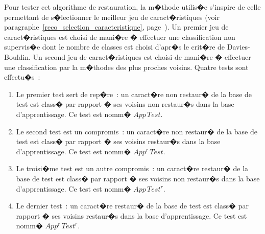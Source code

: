         
        
        
Pour tester cet algorithme de restauration, la m�thode utilis�e s'inspire de celle permettant de s�lectionner le meilleur jeu de caract�ristiques (voir paragraphe~\ref{reco_selection_caracteristique}, page~\pageref{reco_selection_caracteristique}). Un premier jeu de caract�ristiques est choisi de mani�re � effectuer une classification non supervis�e dont le nombre de classes est choisi d'apr�s le crit�re de Davies-Bouldin. Un second jeu de caract�ristiques est choisi de mani�re � effectuer une classification par la m�thodes des plus proches voisins. Quatre tests sont effectu�s~:

            \begin{enumerate}
            \item Le premier test sert de rep�re~: un caract�re non restaur� de la base de test est class� 
                        par rapport � ses voisins non restaur�s dans la base d'apprentissage. Ce test est nomm� $App \, Test$.
            \item Le second test est un compromis~: un caract�re non restaur� de la base de test est class� 
                        par rapport � ses voisins restaur�s dans la base d'apprentissage. Ce test est nomm� $App^r \, Test$.
            \item Le troisi�me test est un autre compromis~: un caract�re restaur� de la base de test est class� 
                        par rapport � ses voisins non restaur�s dans la base d'apprentissage. Ce test est nomm� $App \, Test^r$.
            \item Le dernier test~: un caract�re restaur� de la base de test est class� 
                        par rapport � ses voisins restaur�s dans la base d'apprentissage. Ce test est nomm� $App^r \, Test^r$.
            \end{enumerate}
            
            


